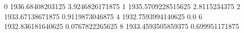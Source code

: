0 1936.68408203125 3.9246826171875
1 1935.5709228515625 2.8115234375
2 1933.67138671875 0.9119873046875
4 1932.7593994140625 0.0
6 1932.836181640625 0.0767822265625
8 1933.4593505859375 0.699951171875
